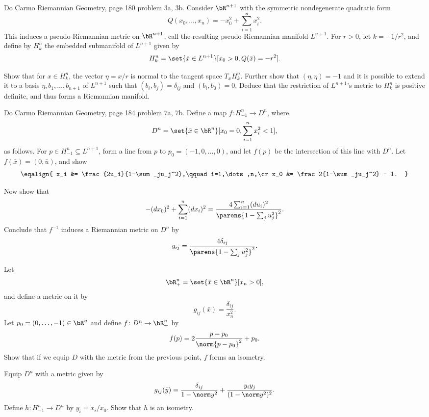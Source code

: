 \bprob

    \benum
        \item Do Carmo Riemannian Geometry, page 180 problem 3a, 3b.
        Consider $\bR^{n+1}$ with the symmetric nondegenerate quadratic form
        $$ Q(x_0,\dots,x_n) = -x_0^2 + \sum_{i=1}^n x_i^2 . $$
        This induces a pseudo-Riemannian metric on $\bR^{n+1}$, call the resulting pseudo-Riemannian manifold $L^{n+1}$.
        For $r>0$, let $k=-1/r^2$, and define by $H^n_k$ the embedded submanifold of $L^{n+1}$ given by
        $$ H^n_k = \set{\bar x\in L^{n+1}}[x_0>0,Q(\bar x)=-r^2] . $$

        Show that for $x\in H^n_k$, the vector $\eta=x/r$ is normal to the tangent space $T_xH^n_k$.
        Further show that $(\eta,\eta)=-1$ and it is possible to extend it to a basis $\eta,b_1,\dots,b_{n+1}$ of $L^{n+1}$
        such that $(b_i,b_j)=\delta_{ij}$ and $(b_i,b_0)=0$.
        Deduce that the restriction of $L^{n+1}$'s metric to $H^n_k$ is positive definite, and thus forms a Riemannian manifold.

        \item Do Carmo Riemannian Geometry, page 184 problem 7a, 7b.
        Define a map $f\colon H^n_{-1}\to D^n$, where
        $$ D^n = \set{\bar x\in\bR^n}[x_0=0,\sum_{i=1}^nx_i^2<1] , $$
        as follows.
        For $p\in H^n_{-1}\subseteq L^{n+1}$, form a line from $p$ to $p_0=(-1,0,\dots,0)$, and let $f(p)$ be the intersection of this line
        with $D^n$.
        Let $f(\bar x)=(0,\bar u)$, and show
        $$ \eqalign{
            x_i &= \frac{2u_i}{1-\sum_ju_j^2},\qquad i=1,\dots,n,\cr
            x_0 &= \frac2{1-\sum_ju_j^2} - 1.
        } $$

        Now show that
        $$ -(dx_0)^2 + \sum_{i=1}^n(dx_i)^2 = \frac{4\sum_{i=1}^n(du_i)^2}{\parens{1-\sum_ju_j^2}^2} . $$
        Conclude that $f^{-1}$ induces a Riemannian metric on $D^n$ by
        $$ g_{ij} = \frac{4\delta_{ij}}{\parens{1-\sum_ju_j^2}^2} . $$

        \item Let
        $$ \bR^n_+ = \set{\bar x\in\bR^n}[x_n>0] , $$
        and define a metric on it by
        $$ g_{ij}(\bar x) = \frac{\delta_{ij}}{x_n^2} . $$
        Let $p_0=(0,\dots,-1)\in\bR^n$ and define $f\colon D^n\to\bR^n_+$ by
        $$ f(p) = 2\frac{p-p_0}{\norm{p-p_0}^2} + p_0 . $$
        Show that if we equip $D$ with the metric from the previous point, $f$ forms an isometry.

        \item Equip $D^n$ with a metric given by
        $$ g_{ij}(\bar y) = \frac{\delta_{ij}}{1-\norm y^2} + \frac{y_iy_j}{(1-\norm y^2)^2} . $$
        Define $h\colon H^n_{-1}\to D^n$ by $y_i=x_i/x_0$.
        Show that $h$ is an isometry.
    \eenum

